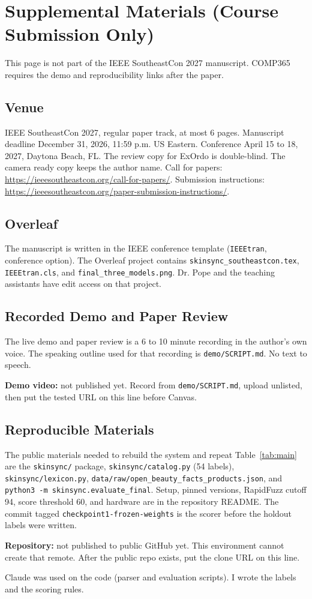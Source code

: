 \documentclass[conference]{IEEEtran}
\begin{document}
\clearpage
\onecolumn
\section*{Supplemental Materials (Course Submission Only)}
This page is not part of the IEEE SoutheastCon 2027 manuscript. COMP365 requires the demo and reproducibility links after the paper.

\subsection*{Venue}
IEEE SoutheastCon 2027, regular paper track, at most 6 pages. Manuscript deadline December 31, 2026, 11:59 p.m. US Eastern. Conference April 15 to 18, 2027, Daytona Beach, FL. The review copy for ExOrdo is double-blind. The camera ready copy keeps the author name. Call for papers: \url{https://ieeesoutheastcon.org/call-for-papers/}. Submission instructions: \url{https://ieeesoutheastcon.org/paper-submission-instructions/}.

\subsection*{Overleaf}
The manuscript is written in the IEEE conference template (\texttt{IEEEtran}, conference option). The Overleaf project contains \texttt{skinsync\_southeastcon.tex}, \texttt{IEEEtran.cls}, and \texttt{final\_three\_models.png}. Dr. Pope and the teaching assistants have edit access on that project.

\subsection*{Recorded Demo and Paper Review}
The live demo and paper review is a 6 to 10 minute recording in the author's own voice. The speaking outline used for that recording is \texttt{demo/SCRIPT.md}. No text to speech.

\textbf{Demo video:} not published yet. Record from \texttt{demo/SCRIPT.md}, upload unlisted, then put the tested URL on this line before Canvas.

\subsection*{Reproducible Materials}
The public materials needed to rebuild the system and repeat Table~\ref{tab:main} are the \texttt{skinsync/} package, \texttt{skinsync/catalog.py} (54 labels), \texttt{skinsync/lexicon.py}, \texttt{data/raw/open\_beauty\_facts\_products.json}, and \texttt{python3 -m skinsync.evaluate\_final}. Setup, pinned versions, RapidFuzz cutoff 94, score threshold 60, and hardware are in the repository README. The commit tagged \texttt{checkpoint1-frozen-weights} is the scorer before the holdout labels were written.

\textbf{Repository:} not published to public GitHub yet. This environment cannot create that remote. After the public repo exists, put the clone URL on this line.

Claude was used on the code (parser and evaluation scripts). I wrote the labels and the scoring rules.
\end{document}
